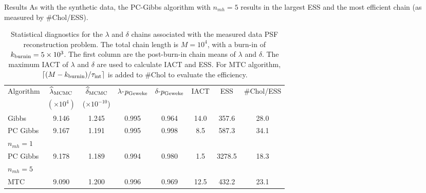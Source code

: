 \begin{chapter}{Results}
As with the synthetic data, the PC-Gibbs algorithm with $n_{mh}=5$ results in the largest ESS and the most efficient chain (as measured by $\#$Chol/ESS).

\begin{table}[h]
\begin{center}
  \begin{tabular}{l|ccccccc}
    \hline
    Algorithm           & $\hat{\lambda}_{\rm MCMC}$& $\hat{\delta}_{\rm MCMC}$& $\lambda$-$p_{\rm Geweke}$&$\delta$-$p_{\rm Geweke}$& IACT & ESS    & \#Chol/ESS \\
     & $(\times 10^{4})$ & ($\times 10^{-10}$) & & \\
    \hline
	          Gibbs &                 9.146 &               1.245  &                     0.995 &                    0.964& 14.0 &  357.6 &      28.0 \\
PC Gibbs  &                 9.167 &               1.191  &                     0.995 &                    0.998&  8.5 &  587.3 &      34.1 \\
 \hspace{.2in}$n_{mh}=1$ & & & & & & & \\
PC Gibbs &                 9.178 &               1.189  &                     0.994 &                    0.980&  1.5 & 3278.5 &      18.3 \\
\hspace{.2in} $n_{mh}=5$ & & & & & & & \\
		    MTC &                 9.090 &               1.200  &                     0.996 &                    0.969& 12.5 &  432.2 &      23.1 \\
    \hline
  \end{tabular}
  \caption{ Statistical diagnostics for the $\lambda$ and $\delta$ chains associated with the measured data PSF reconstruction problem. The total chain length is $M=10^4$, with a burn-in of $k_{\rm burnin} = 5\times10^3$. The first column are the post-burn-in chain means of $\lambda$ and $\delta$. The maximum IACT of $\lambda$ and $\delta$ are used to calculate IACT and ESS. For MTC algorithm, $\lceil(M-k_{\rm burnin})/\tau_{\rm int}\rceil$ is added to \#Chol to evaluate the efficiency.} \label{tab:CygnusPsfRecon}
\end{center}
\end{table}


\end{chapter}
